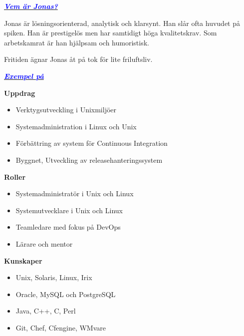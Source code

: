 \documentclass[11pt,a4paper,oneside]{article}
\begin{document}
\begin{minipage}[t]{7.5cm}
  \parskip 6pt
  {\fontsize{16pt}{24pt}\selectfont\textbf{\emph{\uline{\textcolor{blue}{Vem är Jonas?}}}}}

  Jonas är lösningsorienterad, analytisk och klarsynt. Han slår ofta
  huvudet på spiken. Han är prestigelös men har samtidigt höga
  kvalitetskrav. Som arbetskamrat är han hjälpsam och humoristisk.

  Fritiden ägnar Jonas åt på tok för lite friluftsliv.
\end{minipage}
\hspace{0.5cm}
\begin{minipage}[t]{8.25cm}
  \parskip 6pt
  \raggedright
  {\fontsize{16pt}{24pt}\selectfont\textbf{\emph{\uline{\textcolor{blue}{Exempel på}}}}}

  {\fontsize{12pt}{14pt}\selectfont\textbf{Uppdrag}}
  \vspace{-12pt}
  \begin{itemize}
    \item Verktygsutveckling i Unixmiljöer
    \item Systemadministration i Linux och Unix
    \item Förbättring av system för Continuous Integration
    \item Byggnet, Utveckling av releasehanteringssystem
  \end{itemize}
  \vspace{-12pt}
  {\fontsize{12pt}{14pt}\selectfont\textbf{Roller}}
  \vspace{-12pt}
  \begin{itemize}
    \item Systemadministratör i Unix och Linux
    \item Systemutvecklare i Unix och Linux
    \item Teamledare med fokus på DevOps
    \item Lärare och mentor
  \end{itemize}
  \vspace{-12pt}
  {\fontsize{12pt}{14pt}\selectfont\textbf{Kunskaper}}
  \vspace{-12pt}
  \begin{itemize}
     \item Unix, Solaris, Linux, Irix
     \item Oracle, MySQL och PostgreSQL
     \item Java, C++, C, Perl
     \item Git, Chef, Cfengine, WMvare
  \end{itemize}
\end{minipage}
\end{document}
